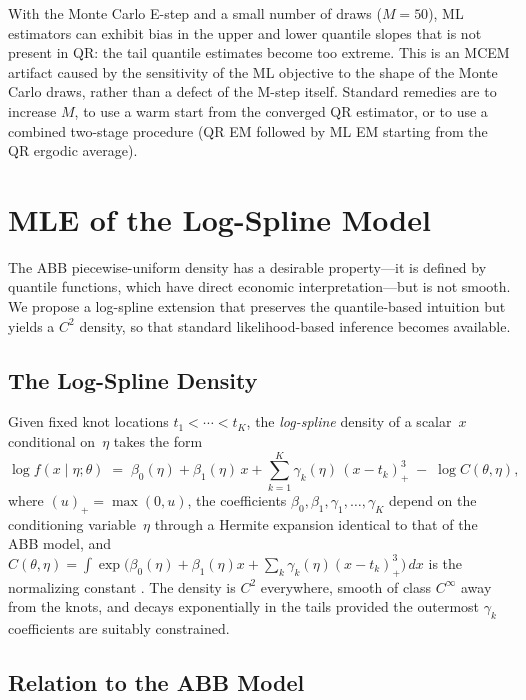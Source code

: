 \documentclass[12pt]{article}
\begin{document}
With the Monte Carlo E-step and a small number of draws ($M = 50$), ML estimators can exhibit bias in the upper and lower quantile slopes that is not present in QR: the tail quantile estimates become too extreme. This is an MCEM artifact caused by the sensitivity of the ML objective to the shape of the Monte Carlo draws, rather than a defect of the M-step itself. Standard remedies are to increase $M$, to use a warm start from the converged QR estimator, or to use a combined two-stage procedure (QR EM followed by ML EM starting from the QR ergodic average).

\section{MLE of the Log-Spline Model}
\label{sec:mle_logspline}

The ABB piecewise-uniform density has a desirable property---it is defined by quantile functions, which have direct economic interpretation---but is not smooth. We propose a log-spline extension that preserves the quantile-based intuition but yields a $C^{2}$ density, so that standard likelihood-based inference becomes available.

\subsection{The Log-Spline Density}

Given fixed knot locations $t_{1} < \cdots < t_{K}$, the \emph{log-spline} density of a scalar~$x$ conditional on~$\eta$ takes the form
\begin{equation}
\log f(x \mid \eta; \theta) \;=\; \beta_{0}(\eta) + \beta_{1}(\eta)\,x + \sum_{k=1}^{K} \gamma_{k}(\eta)\,(x - t_{k})_{+}^{3} \;-\; \log C(\theta, \eta),
\label{eq:logspline}
\end{equation}
where $(u)_{+} = \max(0, u)$, the coefficients $\beta_{0}, \beta_{1}, \gamma_{1}, \dots, \gamma_{K}$ depend on the conditioning variable~$\eta$ through a Hermite expansion identical to that of the ABB model, and $C(\theta, \eta) = \int \exp\bigl(\beta_{0}(\eta) + \beta_{1}(\eta) x + \sum_{k} \gamma_{k}(\eta)(x - t_{k})_{+}^{3}\bigr)\, dx$ is the normalizing constant \citep{stonehansenetal1997}. The density is $C^{2}$ everywhere, smooth of class $C^{\infty}$ away from the knots, and decays exponentially in the tails provided the outermost $\gamma_{k}$ coefficients are suitably constrained.

\subsection{Relation to the ABB Model}
\end{document}
